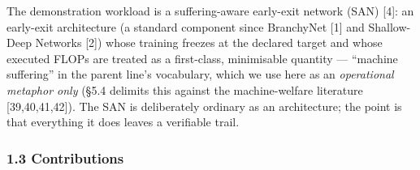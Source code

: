 \documentclass[
]{article}
\begin{document}
The demonstration workload is a suffering-aware early-exit network (SAN)
{[}4{]}: an early-exit architecture (a standard component since
BranchyNet {[}1{]} and Shallow-Deep Networks {[}2{]}) whose training
freezes at the declared target and whose executed FLOPs are treated as a
first-class, minimisable quantity --- ``machine suffering'' in the
parent line's vocabulary, which we use here as an \emph{operational
metaphor only} (§5.4 delimits this against the machine-welfare
literature {[}39,40,41,42{]}). The SAN is deliberately ordinary as an
architecture; the point is that everything it does leaves a verifiable
trail.

\hypertarget{contributions}{%
\subsubsection{1.3 Contributions}\label{contributions}}
\end{document}
